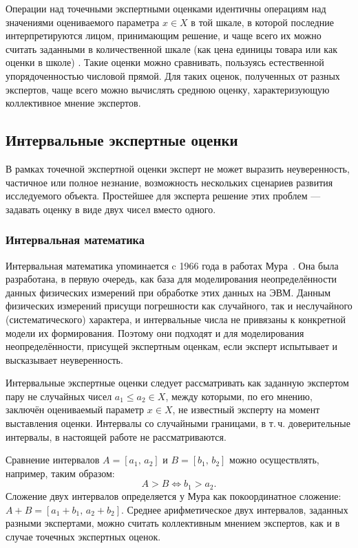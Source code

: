 Операции над точечными экспертными оценками идентичны операциям над значениями оцениваемого параметра  $x \in X$  в той шкале, в которой последние интерпретируются лицом, принимающим решение, и чаще всего их можно считать заданными в количественной шкале (как цена единицы товара или как оценки в школе) \cite{Mirkin}. Такие оценки можно сравнивать, пользуясь естественной упорядоченностью числовой прямой. Для таких оценок, полученных от разных экспертов, чаще всего можно вычислять среднюю оценку, характеризующую коллективное мнение экспертов. 

\subsection{Интервальные экспертные оценки}

В рамках точечной экспертной оценки эксперт не может выразить неуверенность, частичное или полное незнание, возможность нескольких сценариев развития исследуемого объекта. Простейшее для эксперта решение этих проблем --- задавать оценку в виде двух чисел вместо одного.

\subsubsection{Интервальная математика}

Интервальная математика упоминается c 1966 года в работах Мура~\cite{moore1966interval, moore2009introduction}. Она была разработана, в первую очередь, как база для моделирования неопределённости данных физических измерений при обработке этих данных на ЭВМ. Данным физических измерений присущи погрешности как случайного, так и неслучайного (систематического) характера, и интервальные числа не привязаны к конкретной модели их формирования. Поэтому они подходят и для моделирования неопределённости, присущей экспертным оценкам, если эксперт испытывает и высказывает неуверенность. 

Интервальные экспертные оценки следует рассматривать как заданную экспертом пару не случайных чисел $a_1 \leq a_2 \in X$, между которыми, по его мнению, заключён оцениваемый параметр $x \in X$, не известный эксперту на момент выставления оценки.  Интервалы со случайными границами, в т.\,ч. доверительные интервалы, в настоящей работе не рассматриваются.

Сравнение интервалов $A = [a_1,\,a_2]$ и $B = [b_1,\,b_2]$ можно осуществлять, например, таким образом:
\begin{equation*}
    A > B \Leftrightarrow b_1 > a_2. 
\end{equation*}
Сложение двух интервалов  определяется у Мура как покоординатное сложение: $A + B = [a_1+b_1,\,a_2+b_2]$. Среднее арифметическое двух интервалов, заданных разными экспертами, можно считать коллективным мнением экспертов, как и в случае точечных экспертных оценок.

